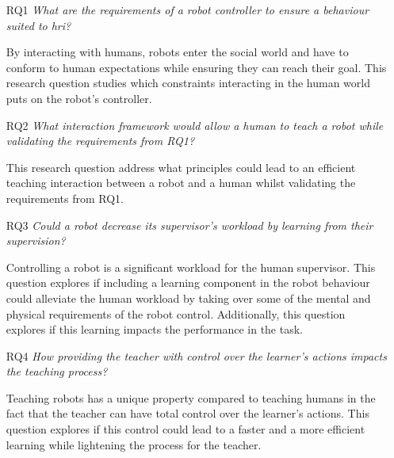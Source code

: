 \begin{itemize}
	\item [RQ1] \emph{What are the requirements of a robot controller to ensure a behaviour suited to \gls{hri}?} 
	
		By interacting with humans, robots enter the social world and have to conform to human expectations while ensuring they can reach their goal. This research question studies which constraints interacting in the human world puts on the robot's controller. 
		
    \item [RQ2] \emph{What interaction framework would allow a human to teach a robot while validating the requirements from RQ1?}
    
    	This research question address what principles could lead to an efficient teaching interaction between a robot and a human whilst validating the requirements from RQ1. 
    	
    \item [RQ3] \emph{Could a robot decrease its supervisor's workload by learning from their supervision?}
    
        Controlling a robot is a significant workload for the human supervisor. This question explores if including a learning component in the robot behaviour could alleviate the human workload by taking over some of the mental and physical requirements of the robot control. Additionally, this question explores if this learning impacts the performance in the task.
    
    \item [RQ4] \emph{How providing the teacher with control over the learner's actions impacts the teaching process?} 
    
    	Teaching robots has a unique property compared to teaching humans in the fact that the teacher can have total control over the learner's actions. This question explores if this control could lead to a faster and a more efficient learning while lightening the process for the teacher.


\end{itemize}

